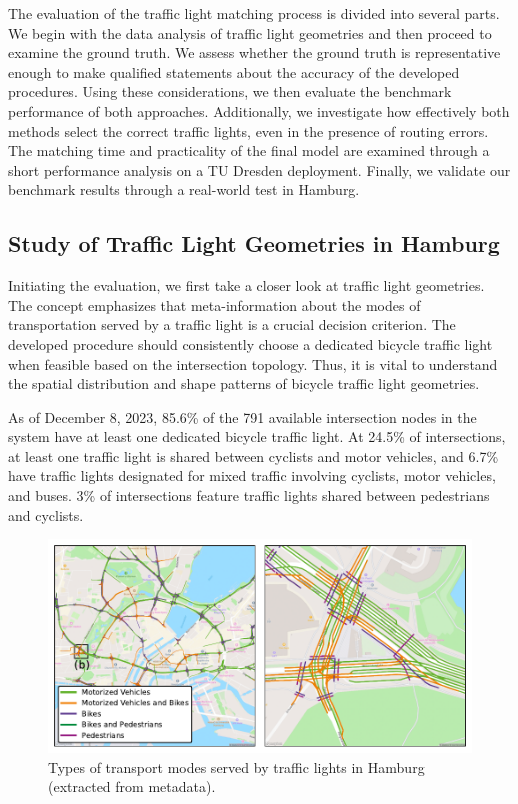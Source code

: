 The evaluation of the traffic light matching process is divided into several parts. We begin with the data analysis of traffic light geometries and then proceed to examine the ground truth. We assess whether the ground truth is representative enough to make qualified statements about the accuracy of the developed procedures. Using these considerations, we then evaluate the benchmark performance of both approaches. Additionally, we investigate how effectively both methods select the correct traffic lights, even in the presence of routing errors. The matching time and practicality of the final model are examined through a short performance analysis on a TU Dresden deployment. Finally, we validate our benchmark results through a real-world test in Hamburg.

\subsection{Study of Traffic Light Geometries in Hamburg}

Initiating the evaluation, we first take a closer look at traffic light geometries. The concept emphasizes that meta-information about the modes of transportation served by a traffic light is a crucial decision criterion. The developed procedure should consistently choose a dedicated bicycle traffic light when feasible based on the intersection topology. Thus, it is vital to understand the spatial distribution and shape patterns of bicycle traffic light geometries.

As of December 8, 2023, 85.6\% of the 791 available intersection nodes in the system have at least one dedicated bicycle traffic light. At 24.5\% of intersections, at least one traffic light is shared between cyclists and motor vehicles, and 6.7\% have traffic lights designated for mixed traffic involving cyclists, motor vehicles, and buses. 3\% of intersections feature traffic lights shared between pedestrians and cyclists.

\begin{figure}[t]
\centering
\includegraphics[width=\linewidth]{images/lanes-map.pdf}
\caption{Types of transport modes served by traffic lights in Hamburg (extracted from metadata).}
\label{fig:lanes-map}
\end{figure}

